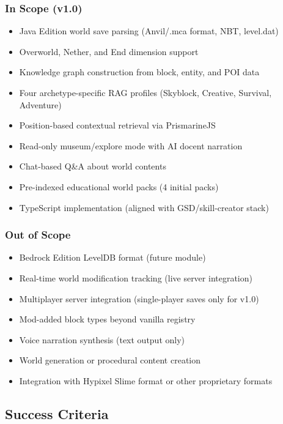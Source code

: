 \documentclass[11pt,letterpaper]{article}
\begin{document}
\subsubsection*{In Scope (v1.0)}
\begin{itemize}[leftmargin=2em]
\item Java Edition world save parsing (Anvil/.mca format, NBT, level.dat)
\item Overworld, Nether, and End dimension support
\item Knowledge graph construction from block, entity, and POI data
\item Four archetype-specific RAG profiles (Skyblock, Creative, Survival, Adventure)
\item Position-based contextual retrieval via PrismarineJS
\item Read-only museum/explore mode with AI docent narration
\item Chat-based Q\&A about world contents
\item Pre-indexed educational world packs (4 initial packs)
\item TypeScript implementation (aligned with GSD/skill-creator stack)
\end{itemize}

\subsubsection*{Out of Scope}
\begin{itemize}[leftmargin=2em]
\item Bedrock Edition LevelDB format (future module)
\item Real-time world modification tracking (live server integration)
\item Multiplayer server integration (single-player saves only for v1.0)
\item Mod-added block types beyond vanilla registry
\item Voice narration synthesis (text output only)
\item World generation or procedural content creation
\item Integration with Hypixel Slime format or other proprietary formats
\end{itemize}

\subsection{Success Criteria}
\end{document}
